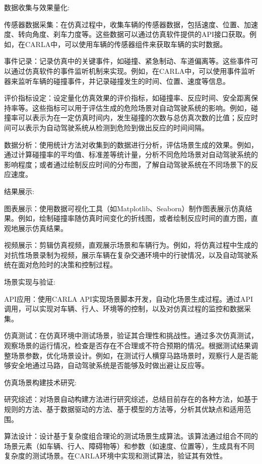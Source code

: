 数据收集与效果量化:

传感器数据采集：在仿真过程中，收集车辆的传感器数据，包括速度、位置、加速度、转向角度、刹车力度等。这些数据可以通过仿真软件提供的API接口获取。例如，在CARLA中，可以使用车辆的传感器组件来获取车辆的实时数据。

事件记录：记录仿真中的关键事件，如碰撞、紧急制动、车道偏离等。这些事件可以通过仿真软件的事件监听机制来实现。例如，在CARLA中，可以使用事件监听器来监听车辆的碰撞事件，并记录碰撞发生的时间、位置、速度等信息。

评价指标设定：设定量化仿真效果的评价指标，如碰撞率、反应时间、安全距离保持率等。这些指标可以用于评估生成的危险场景对自动驾驶系统的影响。例如，碰撞率可以表示为在一定仿真时间内，发生碰撞的次数与总仿真次数的比值；反应时间可以表示为自动驾驶系统从检测到危险到做出反应的时间间隔。

数据分析：使用统计方法对收集到的数据进行分析，评估场景生成的效果。例如，通过计算碰撞率的平均值、标准差等统计量，分析不同危险场景对自动驾驶系统的影响程度；或者通过绘制反应时间的分布图，了解自动驾驶系统在不同场景下的反应速度。

结果展示:

图表展示：使用数据可视化工具（如Matplotlib、Seaborn）制作图表展示仿真结果。例如，绘制碰撞率随仿真时间变化的折线图，或者绘制反应时间的直方图，直观地展示仿真结果。

视频展示：剪辑仿真视频，直观展示场景和车辆行为。例如，将仿真过程中生成的对抗性场景录制为视频，展示车辆在复杂交通环境中的行驶情况，以及自动驾驶系统在面对危险时的决策和控制过程。

场景实现与验证:

API应用：使用CARLA API实现场景脚本开发，自动化场景生成过程。通过API调用，可以实现对车辆、行人、环境等的控制，以及对仿真过程的监控和数据采集。

仿真测试：在仿真环境中测试场景，验证其合理性和挑战性。通过多次仿真测试，观察场景的运行情况，检查是否存在不合理或不符合预期的情况。根据测试结果调整场景参数，优化场景设计。例如，在测试行人横穿马路场景时，观察行人是否能够安全地通过马路，自动驾驶系统是否能够及时做出避让反应等。

仿真场景构建技术研究:

研究综述：对场景自动构建方法进行研究综述，总结目前存在的各种方法，如基于规则的方法、基于数据驱动的方法、基于模型的方法等，分析其优缺点和适用范围。

算法设计：设计基于复杂度组合理论的测试场景生成算法。该算法通过组合不同的场景元素（如车辆、行人、障碍物等）和参数（如速度、位置等），生成具有不同复杂度的测试场景。在CARLA环境中实现和测试算法，验证其有效性。

